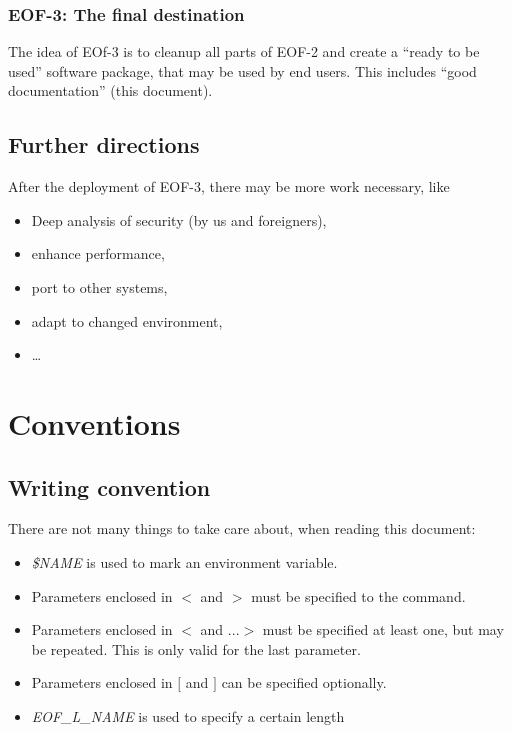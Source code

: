 \documentclass[12pt,a4paper]{book}
\begin{document}
\subsubsection{EOF-3: The final destination}
The idea of EOf-3 is to cleanup all parts of EOF-2 and create a
"`ready to be used"' software package, that may be used by end users.
This includes "`good documentation"' (this document).
\subsection{Further directions}
After the deployment of EOF-3, there may be more work necessary, like
\begin{itemize}
\item Deep analysis of security (by us and foreigners),
\item enhance performance,
\item port to other systems,
\item adapt to changed environment,
\item \ldots{}
\end{itemize}
\section{Conventions}
\subsection{Writing convention}
There are not many things to take care about, when reading this document:
\begin{itemize}
\item \emph{\$NAME} is used to mark an environment variable.
\item Parameters enclosed in $<$ and $>$ must be specified to the command.
\item Parameters enclosed in $<$ and $...>$ must be specified at least one,
but may be repeated. This is only valid for the last parameter.
\item Parameters enclosed in $[$ and $]$ can be specified optionally.
\item \emph{EOF\_L\_\textit{NAME}} is used to specify a certain length
\end{itemize}
\end{document}
